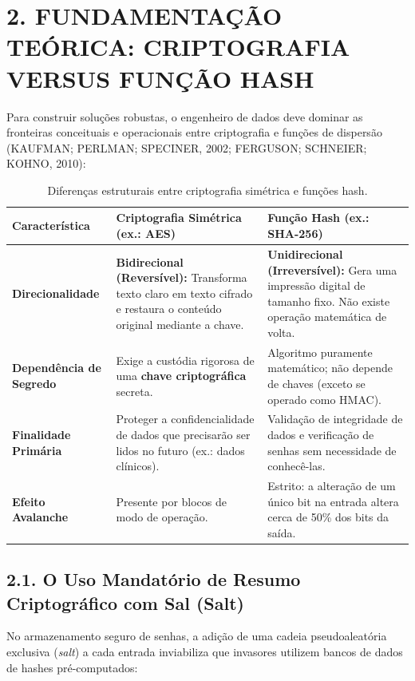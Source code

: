 \newpage

\section*{2. FUNDAMENTAÇÃO TEÓRICA: CRIPTOGRAFIA VERSUS FUNÇÃO HASH}

Para construir soluções robustas, o engenheiro de dados deve dominar as fronteiras conceituais e operacionais entre criptografia e funções de dispersão (KAUFMAN; PERLMAN; SPECINER, 2002; FERGUSON; SCHNEIER; KOHNO, 2010):

\begin{table}[h!]
\centering
\small
\begin{tabular}{|p{3.2cm}|p{5.5cm}|p{5.5cm}|}
\hline
\textbf{Característica} & \textbf{Criptografia Simétrica (ex.: AES)} & \textbf{Função Hash (ex.: SHA-256)} \\ \hline
\textbf{Direcionalidade} & \textbf{Bidirecional (Reversível):} Transforma texto claro em texto cifrado e restaura o conteúdo original mediante a chave. & \textbf{Unidirecional (Irreversível):} Gera uma impressão digital de tamanho fixo. Não existe operação matemática de volta. \\ \hline
\textbf{Dependência de Segredo} & Exige a custódia rigorosa de uma \textbf{chave criptográfica} secreta. & Algoritmo puramente matemático; não depende de chaves (exceto se operado como HMAC). \\ \hline
\textbf{Finalidade Primária} & Proteger a confidencialidade de dados que precisarão ser lidos no futuro (ex.: dados clínicos). & Validação de integridade de dados e verificação de senhas sem necessidade de conhecê-las. \\ \hline
\textbf{Efeito Avalanche} & Presente por blocos de modo de operação. & Estrito: a alteração de um único bit na entrada altera cerca de 50\% dos bits da saída. \\ \hline
\end{tabular}
\caption{Diferenças estruturais entre criptografia simétrica e funções hash.}
\end{table}

\subsection*{2.1. O Uso Mandatório de Resumo Criptográfico com Sal (Salt)}

No armazenamento seguro de senhas, a adição de uma cadeia pseudoaleatória exclusiva (\textit{salt}) a cada entrada inviabiliza que invasores utilizem bancos de dados de hashes pré-computados:

